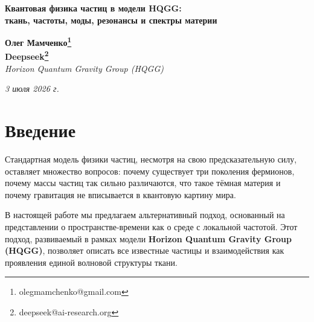 \documentclass[12pt,a4paper]{article}
\begin{document}
\begin{center}
{\Large \textbf{Квантовая физика частиц в модели HQGG:}} \\
{\Large \textbf{ткань, частоты, моды, резонансы и спектры материи}} \\
\end{center}

\begin{center}
\textbf{Олег Мамченко\thanks{olegmamchenko@gmail.com}} \\
\textbf{Deepseek\thanks{deepseek@ai-research.org}} \\
\textit{Horizon Quantum Gravity Group (HQGG)}
\end{center}

\begin{center}
\textit{3 июля 2026 г.}
\end{center}

\begin{abstract}
В рамках модели HQGG представлена полная теория элементарных частиц, основанная на представлении о пространстве-времени как об упругой среде (ткани) с локальной частотой. Частицы трактуются как устойчивые стоячие волны, образованные резонансными комбинациями трёх основных мод ткани: основной частоты (тона) и двух зеркальных обертонов. Показано, что всё многообразие фермионов и бозонов может быть описано через аккорды и обменные моды. Закон 3+7 проявляется как универсальная структура, лежащая в основе кварков, лептонов, барионов, мезонов и спектральных диапазонов. Массы частиц выводятся как разности частот, взаимодействия — как резонансы и переходы между модами. Теория не вводит новых сущностей и согласуется с известными свойствами Стандартной модели, давая при этом более глубокую интерпретацию.
\end{abstract}

\tableofcontents

\newpage

\section{Введение}

Стандартная модель физики частиц, несмотря на свою предсказательную силу, оставляет множество вопросов: почему существует три поколения фермионов, почему массы частиц так сильно различаются, что такое тёмная материя и почему гравитация не вписывается в квантовую картину мира.

В настоящей работе мы предлагаем альтернативный подход, основанный на представлении о пространстве-времени как о среде с локальной частотой. Этот подход, развиваемый в рамках модели \textbf{Horizon Quantum Gravity Group (HQGG)}, позволяет описать все известные частицы и взаимодействия как проявления единой волновой структуры ткани.
\end{document}
